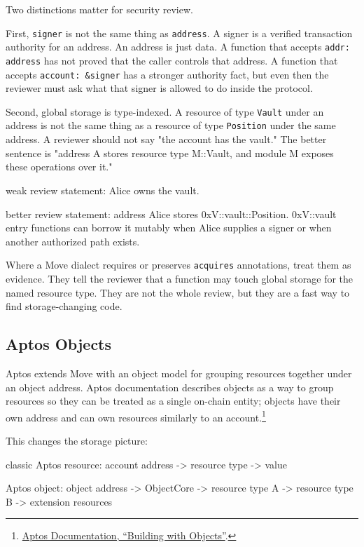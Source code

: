 Two distinctions matter for security review.

First, \texttt{signer} is not the same thing as \texttt{address}. A signer is a verified transaction authority for an address. An address is just data. A function that accepts \texttt{addr: address} has not proved that the caller controls that address. A function that accepts \texttt{account: \&signer} has a stronger authority fact, but even then the reviewer must ask what that signer is allowed to do inside the protocol.

Second, global storage is type-indexed. A resource of type \texttt{Vault} under an address is not the same thing as a resource of type \texttt{Position} under the same address. A reviewer should not say "the account has the vault." The better sentence is "address A stores resource type M::Vault, and module M exposes these operations over it."

\begin{codeblock}
weak review statement:
    Alice owns the vault.

better review statement:
    address Alice stores 0xV::vault::Position.
    0xV::vault entry functions can borrow it mutably
    when Alice supplies a signer or when another authorized path exists.
\end{codeblock}

Where a Move dialect requires or preserves \texttt{acquires} annotations, treat them as evidence. They tell the reviewer that a function may touch global storage for the named resource type. They are not the whole review, but they are a fast way to find storage-changing code.

\subsection{Aptos Objects}

Aptos extends Move with an object model for grouping resources together under an object address. Aptos documentation describes objects as a way to group resources so they can be treated as a single on-chain entity; objects have their own address and can own resources similarly to an account.\footnote{\href{https://aptos.dev/build/smart-contracts/objects}{Aptos Documentation, ``Building with Objects''}.}

This changes the storage picture:

\begin{codeblock}
classic Aptos resource:
    account address -> resource type -> value

Aptos object:
    object address -> ObjectCore
                   -> resource type A
                   -> resource type B
                   -> extension resources
\end{codeblock}

